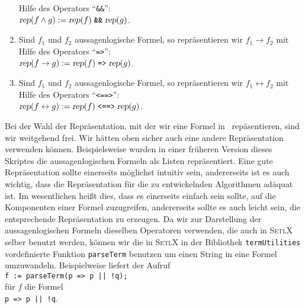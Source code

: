 \begin{enumerate}
      Hilfe des Operators ``\texttt{\&\&}'': \\[0.2cm]
      \hspace*{1.3cm} 
      $\textsl{rep}(f \wedge g) := \textsl{rep}(f) \;\texttt{\&\&}\; \textsl{rep}(g)$.
\item Sind $f_1$ und $f_2$ aussagenlogische Formel, so repr\"{a}sentieren wir $f_1 \rightarrow f_2$ mit Hilfe
      des Operators  ``\texttt{=>}'': \\[0.2cm]
      \hspace*{1.3cm} 
      $\textsl{rep}(f \rightarrow g) := \textsl{rep}(f) \;\texttt{=>}\; \textsl{rep}(g)$.
\item Sind $f_1$ und $f_2$ aussagenlogische Formel, so repr\"{a}sentieren wir 
      $f_1 \leftrightarrow f_2$ mit Hilfe des Operators ``\texttt{<==>}'': \\[0.2cm] 
      \hspace*{1.3cm} 
      $\textsl{rep}(f \leftrightarrow g) := 
       \textsl{rep}(f) \;\texttt{<==>}\; \textsl{rep}(g)$.
\end{enumerate}
Bei der Wahl der Repr\"{a}sentation, mit der wir eine Formel in \setl\ rep\"{a}sentieren,
sind wir weitgehend frei.  Wir h\"{a}tten oben sicher auch eine andere Repr\"{a}sentation
verwenden k\"{o}nnen.  Beispielsweise wurden in einer fr\"{u}heren Version dieses Skriptes die
aussagenlogischen Formeln als Listen repr\"{a}sentiert.
Eine gute Repr\"{a}sentation sollte einerseits m\"{o}glichst intuitiv sein, andererseits ist
es auch wichtig, dass die Repr\"{a}sentation f\"{u}r die zu entwickelnden Algorithmen {\color{red}ad\"{a}quat}
ist.  Im wesentlichen hei\ss{}t dies, dass es einerseits einfach sein sollte, auf
die Komponenten einer Formel zuzugreifen, andererseits sollte es auch leicht sein,
die entsprechende Repr\"{a}sentation zu erzeugen.  Da wir zur Darstellung der
aussagenlogischen Formeln dieselben Operatoren verwenden, die auch in \textsc{SetlX} selber
benutzt werden, k\"{o}nnen wir die in \textsc{SetlX} in der Bibliothek \texttt{termUtilities} 
vordefinierte Funktion \texttt{parseTerm}
benutzen um einen String in eine Formel umzuwandeln.  Beispielweise liefert der Aufruf
\\[0.2cm]
\hspace*{1.3cm}
\texttt{f := parseTerm(p => p || !q);}
\\[0.2cm]
f\"{u}r $f$ die Formel
\\[0.2cm]
\hspace*{1.3cm}
\texttt{p => p || !q}.
\\[0.2cm]
